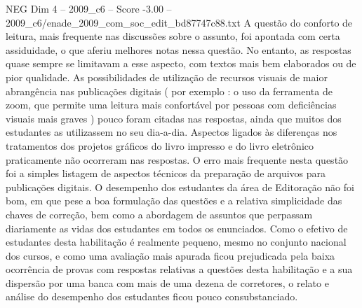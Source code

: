 \begin{textsample}{NEG Dim 4 – 2009\_c6 – Score -3.00 – 2009\_c6/enade\_2009\_com\_soc\_edit\_bd87747c88.txt}
A questão do conforto de leitura, mais frequente nas discussões sobre o assunto, foi apontada com certa assiduidade, o que aferiu melhores notas nessa questão.
No entanto, as respostas quase sempre se limitavam a esse aspecto, com textos mais bem elaborados ou de pior qualidade.
As possibilidades de utilização de recursos visuais de maior abrangência nas publicações digitais ( por exemplo : o uso da ferramenta de zoom, que permite uma leitura mais confortável por pessoas com deficiências visuais mais graves ) pouco foram citadas nas respostas, ainda que muitos dos estudantes as utilizassem no seu dia-a-dia.
Aspectos ligados às diferenças nos tratamentos dos projetos gráficos do livro impresso e do livro eletrônico praticamente não ocorreram nas respostas.
O erro mais frequente nesta questão foi a simples listagem de aspectos técnicos da preparação de arquivos para publicações digitais.
O desempenho dos estudantes da área de Editoração não foi bom, em que pese a boa formulação das questões e a relativa simplicidade das chaves de correção, bem como a abordagem de assuntos que perpassam diariamente as vidas dos estudantes em todos os enunciados.
Como o efetivo de estudantes desta habilitação é realmente pequeno, mesmo no conjunto nacional dos cursos, e como uma avaliação mais apurada ficou prejudicada pela baixa ocorrência de provas com respostas relativas a questões desta habilitação e a sua dispersão por uma banca com mais de uma dezena de corretores, o relato e análise do desempenho dos estudantes ficou pouco consubstanciado.

\end{textsample}
